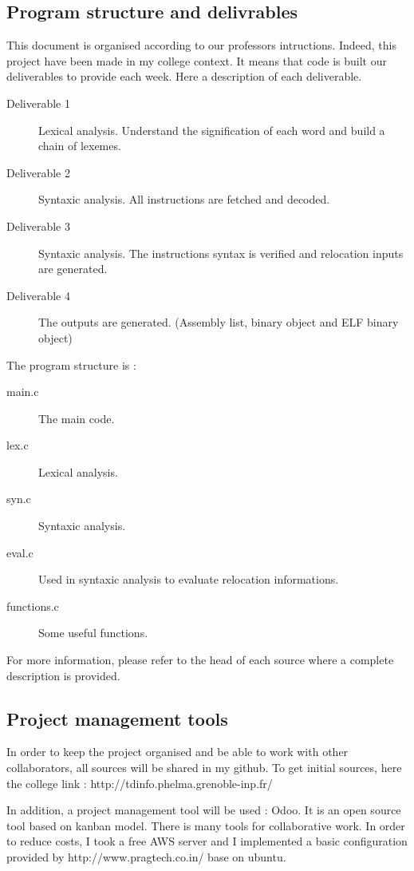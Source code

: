 \documentclass[twoside,twocolumn]{article}
\begin{document}
\subsection{Program structure and delivrables}

This document is organised according to our professors intructions. Indeed, this project have been made in my college context. It means that code is built our deliverables to provide each week. Here a description of each deliverable.

\begin{description}
 \item[ Deliverable 1 ] Lexical analysis. Understand the signification of each word and build a chain of lexemes.
 \item[ Deliverable 2 ] Syntaxic analysis. All instructions are fetched and decoded.
 \item[ Deliverable 3 ] Syntaxic analysis. The instructions syntax is verified and relocation inputs are generated.
 \item[ Deliverable 4 ] The outputs are generated. (Assembly list, binary object and ELF binary object)
\end{description}

The program structure is :
\begin{description}
 \item [ main.c ] The main code.
 \item [ lex.c ] Lexical analysis.
 \item [ syn.c ] Syntaxic analysis.
 \item [ eval.c ] Used in syntaxic analysis to evaluate relocation informations.
 \item [ functions.c ] Some useful functions.
\end{description}

For more information, please refer to the head of each source where a complete description is provided.



\subsection{Project management tools}
In order to keep the project organised and be able to work with other collaborators, all sources will be shared in my github. To get initial sources, here the college link : http://tdinfo.phelma.grenoble-inp.fr/

In addition, a project management tool will be used : Odoo. It is an open source tool based on kanban model. There is many tools for collaborative work. In order to reduce costs, I took a free AWS server and I implemented a basic configuration provided by http://www.pragtech.co.in/ base on ubuntu.
\end{document}

